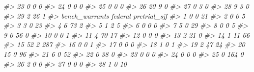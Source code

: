 \documentclass[
]{krantz}
\makeatletter
\newenvironment{Shaded}{\begin{snugshade}}{\end{snugshade}}
\newcommand{\CommentTok}[1]{\textcolor[rgb]{0.37,0.37,0.37}{\textit{#1}}}
\newenvironment{kframe}{%
\medskip{}
\setlength{\fboxsep}{.8em}
 \def\at@end@of@kframe{}%
 \ifinner\ifhmode%
  \def\at@end@of@kframe{\end{minipage}}%
  \begin{minipage}{\columnwidth}%
 \fi\fi%
 \def\FrameCommand##1{\hskip\@totalleftmargin \hskip-\fboxsep
 \colorbox{shadecolor}{##1}\hskip-\fboxsep
     \hskip-\linewidth \hskip-\@totalleftmargin \hskip\columnwidth}%
 \MakeFramed {\advance\hsize-\width
   \@totalleftmargin\z@ \linewidth\hsize
   \@setminipage}}%
 {\par\unskip\endMakeFramed%
 \at@end@of@kframe}
\renewenvironment{Shaded}{\begin{kframe}}{\end{kframe}}
\makeatother
\begin{document}
\begin{Shaded}
\begin{Highlighting}[]
\CommentTok{\#\textgreater{} 23                                  0             0         0}
\CommentTok{\#\textgreater{} 24                                  0             0         0}
\CommentTok{\#\textgreater{} 25                                  0             0         0}
\CommentTok{\#\textgreater{} 26                                 20             9         0}
\CommentTok{\#\textgreater{} 27                                  0             3         0}
\CommentTok{\#\textgreater{} 28                                  9             3         0}
\CommentTok{\#\textgreater{} 29                                  2            26         1}
\CommentTok{\#\textgreater{}    bench\_warrants federal pretrial\_sjf}
\CommentTok{\#\textgreater{} 1               0       0           21}
\CommentTok{\#\textgreater{} 2               0       0            5}
\CommentTok{\#\textgreater{} 3               3       0           23}
\CommentTok{\#\textgreater{} 4               6      73            2}
\CommentTok{\#\textgreater{} 5               1       2            5}
\CommentTok{\#\textgreater{} 6               0       0            0}
\CommentTok{\#\textgreater{} 7               5       0           29}
\CommentTok{\#\textgreater{} 8               0       0            5}
\CommentTok{\#\textgreater{} 9               0      56            0}
\CommentTok{\#\textgreater{} 10              0       0            1}
\CommentTok{\#\textgreater{} 11              4      70           17}
\CommentTok{\#\textgreater{} 12              0       0            0}
\CommentTok{\#\textgreater{} 13              2      21            0}
\CommentTok{\#\textgreater{} 14              1      11           66}
\CommentTok{\#\textgreater{} 15             52       2          287}
\CommentTok{\#\textgreater{} 16              0       0            1}
\CommentTok{\#\textgreater{} 17              0       0            0}
\CommentTok{\#\textgreater{} 18              1       0            1}
\CommentTok{\#\textgreater{} 19              2      47           24}
\CommentTok{\#\textgreater{} 20             15       0           96}
\CommentTok{\#\textgreater{} 21              6       0           52}
\CommentTok{\#\textgreater{} 22              0      38            0}
\CommentTok{\#\textgreater{} 23              0       0            0}
\CommentTok{\#\textgreater{} 24              0       0            0}
\CommentTok{\#\textgreater{} 25              0     164            0}
\CommentTok{\#\textgreater{} 26              2       0            0}
\CommentTok{\#\textgreater{} 27              0       0            0}
\CommentTok{\#\textgreater{} 28              1       0           10}

\end{Highlighting}
\end{Shaded}
\end{document}
